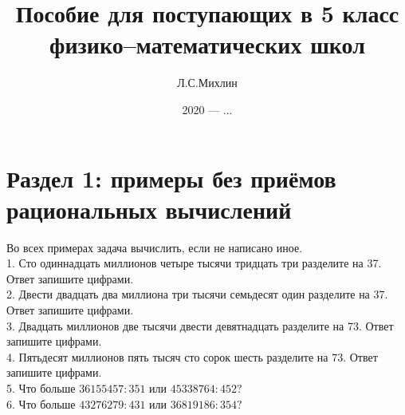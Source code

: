 \documentclass[12pt]{article}
\author{Л.С.\;Михлин}
\title{Пособие для поступающих в 5 класс физико--математических школ}
\date{2020 --- ...}
\begin{document}
\newpage
\tableofcontents
\newpage
\section{Раздел 1: примеры без приёмов рациональных вычислений}
Во всех примерах задача вычислить, если не написано иное.\\
1. Сто одиннадцать миллионов четыре тысячи тридцать три разделите на 37. Ответ запишите цифрами.\\
2. Двести двадцать два миллиона три тысячи семьдесят один разделите на 37. Ответ запишите цифрами.\\
3. Двадцать миллионов две тысячи двести девятнадцать разделите на 73. Ответ запишите цифрами.\\
4. Пятьдесят миллионов пять тысяч сто сорок шесть разделите на 73. Ответ запишите цифрами.\\
5. Что больше $36155457:351$ или $45338764:452?$\\
6. Что больше $43276279:431$ или $36819186:354?$\\
\end{document}
